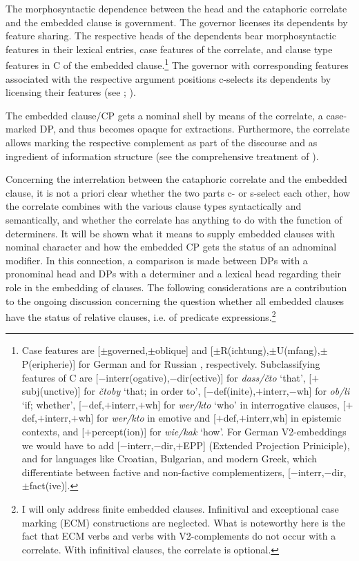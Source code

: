 \documentclass[output=paper,
colorlinks,
citecolor=brown,
newtxmath
]{langscibook}
\begin{document}
    \largerpage[2]

\noindent The morphosyntactic dependence between the head and the cataphoric correlate and the embedded clause is government. The governor licenses its dependents by feature sharing. The respective heads of the dependents bear morphosyntactic features in their lexical entries, case features of the correlate, and clause type features in C of the embedded clause.\footnote{\label{fn:casefeatures}Case features are [$\pm$governed,$\pm$oblique] and [$\pm$R(ichtung),$\pm$U(mfang),$\pm$P(eripherie)] for German \citep[see][]{Bierwisch1967} and for Russian \citep[see][]{Jakobson1936,Jakobson1958}, respectively. Subclassifying features of C are [$-$interr(ogative),$-$dir(ective)] for \textit{dass/čto} `that', [$+$subj(unctive)] for \textit{čtoby} `that; in order to', [$-$def(inite),$+$interr,$-$wh] for \textit{ob/li} `if; whether', [$-$def,$+$interr,$+$wh] for \textit{wer/kto} `who' in interrogative clauses, [$+$def,$+$interr,$+$wh] for \textit{wer/kto} in emotive and [$+$def,$+$interr,\textalpha wh] in epistemic contexts, and [$+$percept(ion)] for \textit{wie/kak} `how'. For German V2-embeddings we would have to add [$-$interr,$-$dir,$+$EPP] (Extended Projection Priniciple), and for languages like Croatian, Bulgarian, and modern Greek, which differentiate between factive and non-factive complementizers, [$-$interr,$-$dir,$\pm$fact(ive)].}
The governor with corresponding features associated with the respective argument positions c-selects its dependents by licensing their features (see \citealt{Zimmermann1990,Zimmermann2013}; \citealt{Pitsch2014a,Pitsch2014b}).

The embedded clause/CP gets a nominal shell by means of the correlate, a case-marked DP, and thus becomes opaque for extractions. Furthermore, the correlate allows marking the respective complement as part of the discourse and as ingredient of information structure (see the comprehensive treatment of \citealt{Willer-Gold2013}).

Concerning the interrelation between the cataphoric correlate and the embedded clause, it is not a priori clear whether the two parts c- or s-select each other, how the correlate combines with the various clause types syntactically and semantically, and whether the correlate has anything to do with the function of determiners. It will be shown what it means to supply embedded clauses with nominal character and how the embedded CP gets the status of an adnominal modifier. In this connection, a comparison is made between DPs with a pronominal head and DPs with a determiner and a lexical head regarding their role in the embedding of clauses. The following considerations are a contribution to the ongoing discussion concerning the question whether all embedded clauses have the status of relative clauses, i.e. of predicate expressions.\footnote{I will only address finite embedded clauses. Infinitival and exceptional case marking (ECM) constructions are neglected. What is noteworthy here is the fact that ECM verbs and verbs with V2-complements do not occur with a correlate. With infinitival clauses, the correlate is optional.}
\end{document}
